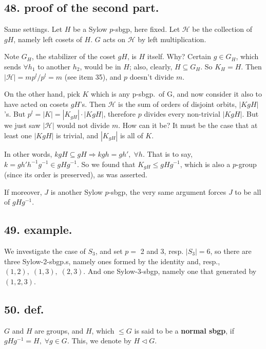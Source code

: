 \documentclass[12pt]{article}
\newcommand\M\cdot%
\newcommand\Ev\forall%
\newcommand{\Ip}{\Rightarrow} %
\newcommand{\SF}[1]{ \mathscr{#1} }%
\newcommand{\Ss}[1]{\textsf{\textbf{#1}}}%
\begin{document}
\subsection*{48. proof of the second part.} Same settings. 
Let \(H\) be a Sylow \(p\)-sbgp, here fixed. 
Let \(\SF H\) be the collection of \(gH\), namely left cosets of \(H\). 
\(G\) acts on \(\SF H\) by left multiplication. \par
Note \(G_{H}\), the stabilizer of the coset \(gH\), is \(H\) itself. 
Why? Certain \(g \in G_{H}\), which sends \(\Ev h_1\) to another \(h_2\), would be in \(H\); 
also, clearly, \(H \subseteq G_{H}\). 
So \(K_{H} =H\). 
Then \(|\SF H| = mp^l/ p^l =m\) (see item 35), and \(p\) doesn't divide \(m\). \par
On the other hand, pick \(K\) which is any p-sbgp.\ of G, and now consider it also to have acted on cosets \(gH\)'s. 
Then \(\SF H\) is the sum of orders of disjoint orbits, \(|KgH|\)'s. 
But \(p^l = |K| = |K_{gH}| \M |KgH|\), 
therefore \(p\) divides every non-trivial \(|KgH|\). 
But we just saw \(|\SF H|\) would not divide \(m\). 
How can it be? It must be the case that at least one \(|KgH|\) is trivial, and \(|K_{gH}|\) is all of \(K\). \par
In other words, \(kgH \subseteq gH \Ip kgh = gh',\; \Ev h\). 
That is to say, \(k= gh'h^{-1}g^{-1} \in gHg^{-1}\). 
So we found that \(K_{gH} \leq gHg^{-1}\), which is also a \(p\)-group (since its order is preserved), as was asserted. \par
If moreover, \(J\) is another Sylow \(p\)-sbgp, 
the very same argument forces \(J\) to be all of \(gHg^{-1}\). 

\subsection*{49. example.} We investigate the case of \(S_3\), and set \(p=\) 2 and 3, resp. 
\(|S_3|=6\), so there are three Sylow-2-sbgp.s, namely ones formed by the identity and, resp., \((1,2),\; (1,3),\; (2,3)\). 
And one Sylow-3-sbgp, namely one that generated by \((1,2,3)\). 

\subsection*{50. def.} \(G\) and \(H\) are groups, and \(H\), which \(\leq G\) is said to be a \Ss{normal sbgp}, if \(gHg^{-1} = H,\; \Ev g \in G\). This, we denote by \(H \lhd G\).
\end{document}
